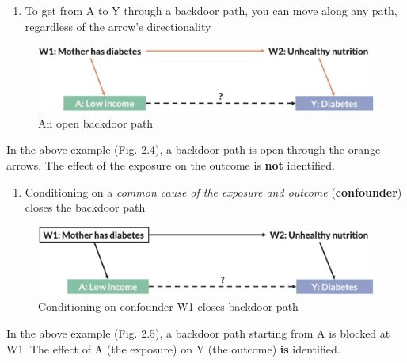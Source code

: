 \documentclass[
]{book}
\providecommand{\tightlist}{%
  \setlength{\itemsep}{0pt}\setlength{\parskip}{0pt}}
\begin{document}
\begin{enumerate}
\def\labelenumi{\arabic{enumi}.}
\tightlist
\item
  To get from A to Y through a backdoor path, you can move along any path, regardless of the arrow's directionality
\end{enumerate}

\begin{figure}

{\centering \includegraphics[width=1\linewidth]{img/confounding/dag_rules_1} 

}

\caption{An open backdoor path}\label{fig:unnamed-chunk-6}
\end{figure}

In the above example (Fig. 2.4), a backdoor path is open through the orange arrows. The effect of the exposure on the outcome is \textbf{not} identified.

\begin{enumerate}
\def\labelenumi{\arabic{enumi}.}
\setcounter{enumi}{1}
\tightlist
\item
  Conditioning on a \emph{common cause of the exposure and outcome} (\textbf{confounder}) closes the backdoor path
\end{enumerate}

\begin{figure}

{\centering \includegraphics[width=1\linewidth]{img/confounding/dag_rules_2} 

}

\caption{Conditioning on confounder W1 closes backdoor path}\label{fig:unnamed-chunk-7}
\end{figure}

In the above example (Fig. 2.5), a backdoor path starting from A is blocked at W1. The effect of A (the exposure) on Y (the outcome) \textbf{is} identified.
\end{document}

